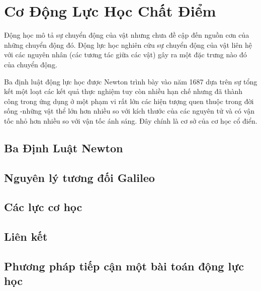   
\chapter{Cơ Động Lực Học Chất Điểm}
Động học mô tả sự chuyển động của vật nhưng chưa đề cập đến nguồn cơn của những chuyển động đó.
Động lực học nghiên cứu sự chuyển động của vật liên hệ với các nguyên nhân (các tương tác giữa các vật) gây ra một đặc trưng nào đó của chuyển động.
\vspace{8pt}

Ba định luật động lực học được Newton trình bày vào năm 1687 dựa trên sự tổng kết một loạt các kết quả thực nghiệm 
tuy còn nhiều hạn chế nhưng đã thành công trong ứng dụng ở một phạm vi rất lớn các hiện tượng quen thuộc trong đời sống
-những vật thể lớn hơn nhiều so với kích thước của các nguyên tử và có vận tốc nhỏ hơn nhiều so với vận tốc ánh sáng.
Đây chính là cơ sở của cơ học cổ điển.


\section{Ba Định Luật Newton}


\section{Nguyên lý tương đối Galileo}


\section{Các lực cơ học}

\section{Liên kết}


\section{Phương pháp tiếp cận một bài toán động lực học}